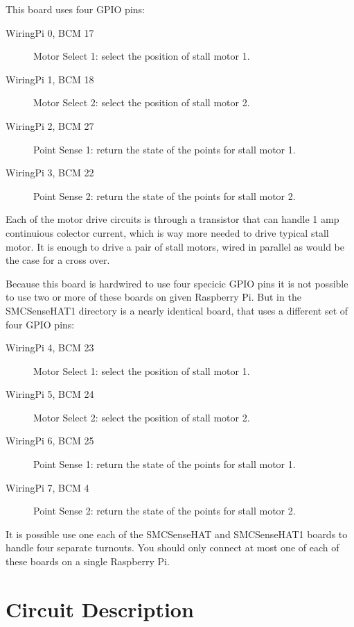 This board uses four GPIO pins:

\begin{description}
\item[WiringPi 0, BCM 17] Motor Select 1: select the position of stall motor 
1. 
\item[WiringPi 1, BCM 18] Motor Select 2: select the position of stall motor 
2. 
\item[WiringPi 2, BCM 27] Point Sense 1: return the state of the points for 
stall motor 1. 
\item[WiringPi 3, BCM 22] Point Sense 2: return the state of the points for 
stall motor 2. 
\end{description}

Each of the motor drive circuits is through a transistor that can handle 1 amp 
continuious colector current, which is way more needed to drive typical stall 
motor.  It is enough to drive a pair of stall motors, wired in parallel as 
would be the case for a cross over.

Because this board is hardwired to use four specicic GPIO pins it is not 
possible to use two or more of these boards on given Raspberry Pi.  But in the 
SMCSenseHAT1 directory is a nearly identical board, that uses a different set 
of four GPIO pins:

\begin{description}
\item[WiringPi 4, BCM 23] Motor Select 1: select the position of stall motor 
1. 
\item[WiringPi 5, BCM 24] Motor Select 2: select the position of stall motor 
2. 
\item[WiringPi 6, BCM 25] Point Sense 1: return the state of the points for 
stall motor 1. 
\item[WiringPi 7, BCM 4] Point Sense 2: return the state of the points for 
stall motor 2. 
\end{description}

It is possible use one each of the SMCSenseHAT and SMCSenseHAT1 boards to 
handle four separate turnouts.  You should only connect at most one of each of 
these boards on a single Raspberry Pi.

\section{Circuit Description}

